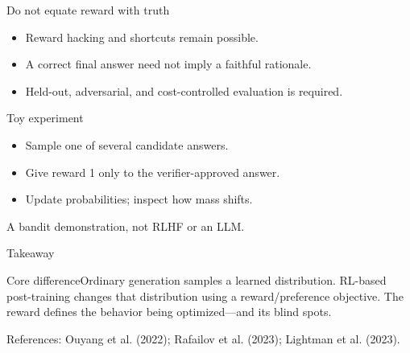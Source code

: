 \documentclass[aspectratio=169,10pt]{beamer}\usetheme{metropolis}
\begin{document}
\begin{frame}{Do not equate reward with truth}\begin{itemize}\item Reward hacking and shortcuts remain possible.\item A correct final answer need not imply a faithful rationale.\item Held-out, adversarial, and cost-controlled evaluation is required.\end{itemize}\end{frame}
\begin{frame}{Toy experiment}\begin{itemize}\item Sample one of several candidate answers.\item Give reward 1 only to the verifier-approved answer.\item Update probabilities; inspect how mass shifts.\end{itemize}\vfill A bandit demonstration, not RLHF or an LLM.\end{frame}
\begin{frame}{Takeaway}\begin{block}{Core difference}Ordinary generation samples a learned distribution. RL-based post-training changes that distribution using a reward/preference objective. The reward defines the behavior being optimized---and its blind spots.\end{block}\vfill\small References: Ouyang et al. (2022); Rafailov et al. (2023); Lightman et al. (2023).\end{frame}
\end{document}
